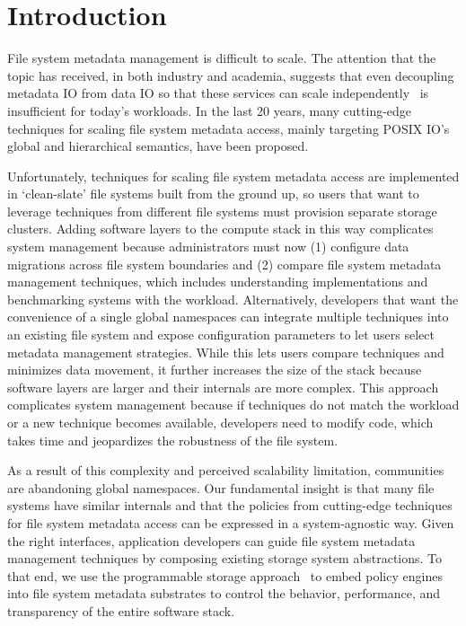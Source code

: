 \chapter{Introduction}

File system metadata management is difficult to scale. The attention that the
topic has received, in both industry and academia, suggests that even
decoupling metadata IO from data IO so that these services can scale
independently~\cite{alam:pdsw2011-metadata-scaling, ghemawat:sosp2003-gfs,
hildebrand:msst2005-pnfs, weil:osdi2006-ceph, welch:fast2008-panasas,
xing:sc2009-skyfs} is insufficient for today's workloads. In the last 20 years,
many cutting-edge techniques for scaling file system metadata access, mainly
targeting POSIX IO's global and hierarchical semantics, have been proposed.

Unfortunately, techniques for scaling file system metadata access are
implemented in `clean-slate' file systems built from the ground up, so users
that want to leverage techniques from different file systems must provision
separate storage clusters. Adding software layers to the compute stack in this
way complicates system management because administrators must now (1) configure
data migrations across file system boundaries and (2) compare file system
metadata management techniques, which includes understanding implementations
and benchmarking systems with the workload.  Alternatively, developers that
want the convenience of a single global namespaces can integrate multiple
techniques into an existing file system and expose configuration parameters to
let users select metadata management strategies.  While this lets users compare
techniques and minimizes data movement, it further increases the size of the
stack because software layers are larger and their internals are more complex.
This approach complicates system management because if techniques do not match
the workload or a new technique becomes available, developers need to modify
code, which takes time and jeopardizes the robustness of the file system.

As a result of this complexity and perceived scalability limitation,
communities are abandoning global namespaces.  Our fundamental insight is that
many file systems have similar internals and that the policies from
cutting-edge techniques for file system metadata access can be expressed in a
system-agnostic way.  Given the right interfaces, application developers can
guide file system metadata management techniques by composing existing storage
system abstractions.  To that end, we use the programmable storage
approach~\cite{sevilla:eurosys17-malacology} to embed policy engines into file
system metadata substrates to control the behavior, performance, and
transparency of the entire software stack.

